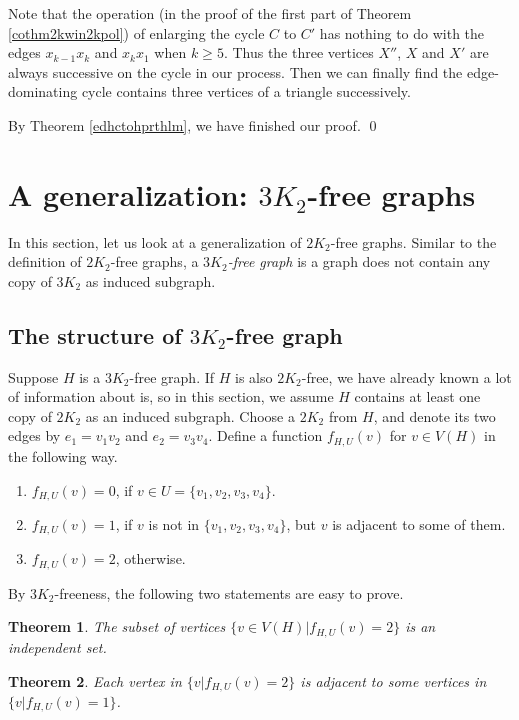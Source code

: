 \documentclass[12pt]{report}
\newtheorem{theorem}{Theorem}
\begin{document}
Note that the operation (in the proof of the first part of Theorem \ref{cothm2kwin2kpol}) of enlarging the cycle $C$ to $C'$ has nothing to do with the edges $x_{k-1}x_k$ and $x_kx_1$ when $k\ge5$. Thus the three vertices $X''$, $X$ and $X'$ are always successive on the cycle in our process. Then we can finally find the edge-dominating cycle contains three vertices of a triangle successively.


By Theorem \ref{edhctohprthlm}, we have finished our proof.
\qed






\section{A generalization: $3K_2$-free graphs}\label{sec553k2}
In this section, let us look at a generalization of $2K_2$-free graphs. Similar to the definition of $2K_2$-free graphs, a {\em $3K_2$-free graph} is a graph does not contain any copy of $3K_2$ as induced subgraph.

\subsection{The structure of $3K_2$-free graph}
Suppose $H$ is a $3K_2$-free graph. If $H$ is also $2K_2$-free, we have already known a lot of information about is, so in this section, we assume $H$ contains at least one copy of $2K_2$ as an induced subgraph. Choose a $2K_2$ from $H$, and denote its two edges by $e_1=v_1v_2$ and $e_2=v_3v_4$. Define a function $f_{H,U}(v)$ for $v\in V(H)$ in the following way.
\begin{enumerate}
\item $f_{H,U}(v)=0$, if $v\in U=\{v_1,v_2,v_3,v_4\}$.
\item $f_{H,U}(v)=1$, if $v$ is not in $\{v_1,v_2,v_3,v_4\}$, but $v$ is adjacent to some of them.
\item $f_{H,U}(v)=2$, otherwise.
\end{enumerate}

By $3K_2$-freeness, the following two statements are easy to prove.
\begin{theorem}
The subset of vertices $\{v\in V(H)|f_{H,U}(v)=2\}$ is an independent set.
\end{theorem}

\begin{theorem}
Each vertex in $\{v|f_{H,U}(v)=2\}$ is adjacent to some vertices in $\{v|f_{H,U}(v)=1\}$.
\end{theorem}
\end{document}
